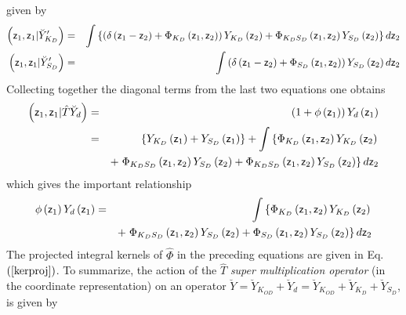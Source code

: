 given by 
\begin{eqnarray}
\left( {\sf z}_{1},{\sf z}_{1}|\breve{Y}_{K_{D}}^{\prime }\right) &=&\int
\left\{ \left( \delta \left( {\sf z}_{1}-{\sf z}_{2}\right) +\Phi
_{K_{D}}\left( {\sf z}_{1},{\sf z}_{2}\right) \right) Y_{K_{D}}\left( {\sf z}%
_{2}\right) +\Phi _{K_{D}S_{D}}\left( {\sf z}_{1},{\sf z}_{2}\right)
Y_{S_{D}}\left( {\sf z}_{2}\right) \right\} d{\sf z}_{2}  \nonumber \\
\left( {\sf z}_{1},{\sf z}_{1}|\breve{Y}_{S_{D}}^{\prime }\right) &=&\int
\left( \delta \left( {\sf z}_{1}-{\sf z}_{2}\right) +\Phi _{S_{D}}\left( 
{\sf z}_{1},{\sf z}_{2}\right) \right) Y_{S_{D}}\left( {\sf z}_{2}\right) d%
{\sf z}_{2}
\end{eqnarray}%
Collecting together the diagonal terms from the last two equations one
obtains 
\begin{eqnarray}
\left( {\sf z}_{1},{\sf z}_{1}|\hat{T}\breve{Y}_{d}\right) &=&\left( 1+\phi
\left( {\sf z}_{1}\right) \right) Y_{d}\left( {\sf z}_{1}\right)  \nonumber
\\
&=&\left\{ Y_{K_{D}}\left( {\sf z}_{1}\right) +Y_{S_{D}}\left( {\sf z}%
_{1}\right) \right\} +\int \left\{ \Phi _{K_{D}}\left( {\sf z}_{1},{\sf z}%
_{2}\right) Y_{K_{D}}\left( {\sf z}_{2}\right) \right.  \nonumber \\
&&+\left. \Phi _{K_{D}S_{D}}\left( {\sf z}_{1},{\sf z}_{2}\right)
Y_{S_{D}}\left( {\sf z}_{2}\right) +\Phi _{K_{D}S_{D}}\left( {\sf z}_{1},%
{\sf z}_{2}\right) Y_{S_{D}}\left( {\sf z}_{2}\right) \right\} d{\sf z}_{2}
\end{eqnarray}%
which gives the important relationship 
\begin{eqnarray}
\phi \left( {\sf z}_{1}\right) Y_{d}\left( {\sf z}_{1}\right) &=&\int
\left\{ \Phi _{K_{D}}\left( {\sf z}_{1},{\sf z}_{2}\right) Y_{K_{D}}\left( 
{\sf z}_{2}\right) \right.  \nonumber \\
&&+\left. \Phi _{K_{D}S_{D}}\left( {\sf z}_{1},{\sf z}_{2}\right)
Y_{S_{D}}\left( {\sf z}_{2}\right) +\Phi _{S_{D}}\left( {\sf z}_{1},{\sf z}%
_{2}\right) Y_{S_{D}}\left( {\sf z}_{2}\right) \right\} d{\sf z}_{2}
\end{eqnarray}%
The projected integral kernels of $\hat{\Phi}$ in the preceding equations
are given in Eq.$\left( \ref{kerproj}\right) $. To summarize, the action of
the $\hat{T}$ {\it super multiplication operator }(in the coordinate
representation) on an operator $\breve{Y}=\breve{Y}_{K_{OD}}+\breve{Y}_{d}=%
\breve{Y}_{K_{OD}}+\breve{Y}_{K_{D}}+\breve{Y}_{S_{D}}$, is given by%
